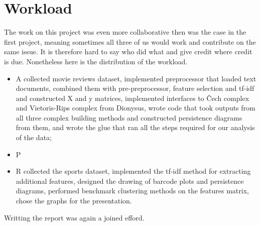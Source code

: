 \section{Workload} 
\label{sec:workload}

The work on this project was even more collaborative then was the case in the
first project, meaning sometimes all three of us would work and contribute on
the same issue. It is therefore hard to say who did what and give credit where
credit is due. Nonetheless here is the distribution of the workload.

\begin{itemize}
  \item A collected movie reviews dataset, implemented preprocessor that loaded
    text documents, combined them with pre-preprocessor, feature selection and
    tf-idf and constructed X and y matrices, implemented interfaces to Čech
    complex and Vietoris-Rips complex from Dionysus, wrote code that took
    outputs from all three complex building methods and constructed persistence
    diagrams from them, and wrote the glue that ran all the steps required for
    our analysis of the data;
  \item P
  \item R collected the sports dataset, implemented the tf-idf method for
    extracting additional features, designed the drawing of barcode plots and
    persistence diagrams, performed benchmark clustering methods on the
    features matrix, chose the graphs for the presentation.
\end{itemize}

Writting the report was again a joined efford.
